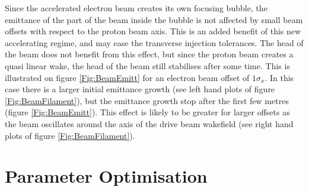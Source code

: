 \documentclass[aps,prstab,reprint,amsmath,amssymb,groupedaddress]{revtex4-1}
\begin{document}


Since the accelerated electron beam creates its own focusing bubble, the emittance of the part of the beam inside the
bubble is not affected by small beam offsets with respect to the proton beam axis. This is an added benefit of this new
accelerating regime, and may ease the transverse injection tolerances. The head of the beam does not benefit from this
effect, but since the proton beam creates a quasi linear wake, the head of the beam still stabilises after some time.
This is illustrated on figure \ref{Fig:BeamEmitt} for an electron beam offset of $1\sigma_{x}$. In this case there is a
larger initial emittance growth (see left hand plots of figure \ref{Fig:BeamFilament}), but the emittance growth stop
after the first few metres (figure \ref{Fig:BeamEmitt}). This effect is likely to be greater for larger offsets as the
beam oscillates around the axis of the drive beam wakefield (see right hand plots of figure \ref{Fig:BeamFilament}).

\section[\label{S:PO}]{Parameter Optimisation}
\end{document}
